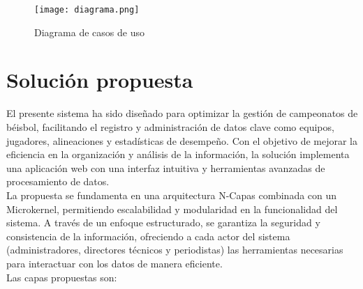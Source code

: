 \documentclass{report}
\begin{document}
    \begin{figure}[h]
        \centering
        \texttt{[image: diagrama.png]}
        \caption{Diagrama de casos de uso}
        \label{fig:gestion_campeonatos1}
    \end{figure}
    \section*{Solución propuesta}
    El presente sistema ha sido diseñado para optimizar la gestión de campeonatos de béisbol, 
    facilitando el registro y administración de datos clave como equipos, jugadores, alineaciones y 
    estadísticas de desempeño. Con el objetivo de mejorar la eficiencia en la organización y análisis 
    de la información, la solución implementa una aplicación web con una interfaz intuitiva y herramientas 
    avanzadas de procesamiento de datos.\\

    La propuesta se fundamenta en una arquitectura N-Capas combinada con un Microkernel, permitiendo escalabilidad y 
    modularidad en la funcionalidad del sistema. A través de un enfoque estructurado, se garantiza la seguridad y consistencia de 
    la información, ofreciendo a cada actor del sistema (administradores, directores técnicos y periodistas) las herramientas necesarias 
    para interactuar con los datos de manera eficiente.\\

    Las capas propuestas son:
\end{document}
